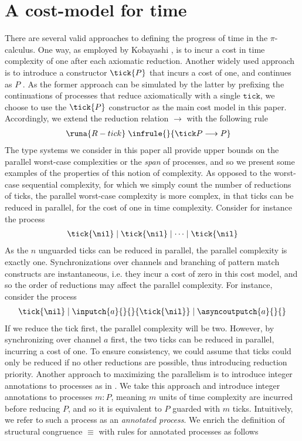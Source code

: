 \section{A cost-model for time}\label{sec:costmodel}
There are several valid approaches to defining the progress of time in the $\pi$-calculus. One way, as employed by Kobayashi \cite{Kobayashi2000}, is to incur a cost in time complexity of one after each axiomatic reduction. Another widely used approach is to introduce a constructor $\tick{P}$ that incurs a cost of one, and continues as $P$ \cite{BaillotGhyselen2021, BaillotEtAl2021, DasEtAl2018}. As the former approach can be simulated by the latter by prefixing the continuations of processes that reduce axiomatically with a single $\texttt{tick}$, we choose to use the $\tick{P}$ constructor as the main cost model in this paper. Accordingly, we extend the reduction relation $\longrightarrow$ with the following rule
%
\begin{align*}
    &\kern0em\runa{R-tick}\; \infrule{}{\tick P \longrightarrow P}
\end{align*}
%
The type systems we consider in this paper all provide upper bounds on the parallel worst-case complexities or the \textit{span} of processes, and so we present some examples of the properties of this notion of complexity. As opposed to the worst-case sequential complexity, for which we simply count the number of reductions of ticks, the parallel worst-case complexity is more complex, in that ticks can be reduced in parallel, for the cost of one in time complexity. Consider for instance the process
\begin{align*}
    \kern0em\tick{\nil} \mid \tick{\nil} \mid \dots \mid \tick{\nil}
\end{align*}
As the $n$ unguarded ticks can be reduced in parallel, the parallel complexity is exactly one. Synchronizations over channels and branching of pattern match constructs are instantaneous, i.e. they incur a cost of zero in this cost model, and so the order of reductions may affect the parallel complexity. For instance, consider the process
\begin{align*}
    \kern0em\tick{\nil} \mid \inputch{a}{}{}{\tick{\nil}} \mid \asyncoutputch{a}{}{}
\end{align*}
If we reduce the tick first, the parallel complexity will be two. However, by synchronizing over channel $a$ first, the two ticks can be reduced in parallel, incurring a cost of one. To ensure consistency, we could assume that ticks could only be reduced if no other reductions are possible, thus introducing reduction priority. Another approach to maximizing the parallelism is to introduce integer annotations to processes as in \cite{BaillotGhyselen2021, BaillotEtAl2021}. We take this approach and introduce integer annotations to processes $m : P$, meaning $m$ units of time complexity are incurred before reducing $P$, and so it is equivalent to $P$ guarded with $m$ ticks. Intuitively, we refer to such a process as an \textit{annotated process}. We enrich the definition of structural congruence $\equiv$ with rules for annotated processes as follows
